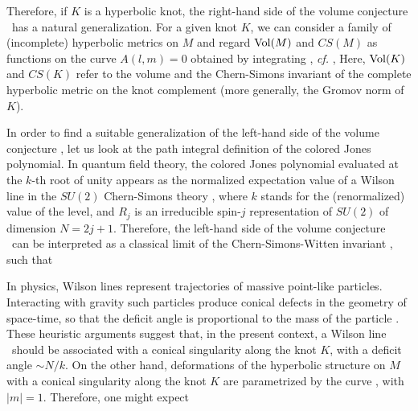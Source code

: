 Therefore, if $K$ is a hyperbolic knot, the right-hand side of
the volume conjecture \csvolumeconj\ has a natural generalization.
For a given knot $K$, we can consider a family
of (incomplete) hyperbolic metrics on $M$
and regard ${\rm Vol}(M)$ and $CS(M)$ as functions
on the curve $A(l,m)=0$ obtained by integrating \csvoldiff,
{\it cf.} \pdqint,
%
\eqn{}
%
Here, ${\rm Vol} (K)$ and $CS(K)$ refer to the volume and
the Chern-Simons invariant of the complete hyperbolic
metric on the knot complement
(more generally, the Gromov norm of $K$).

In order to find a suitable generalization of the left-hand
side of the volume conjecture \csvolumeconj, let us look at
the path integral definition of the colored Jones polynomial.
In quantum field theory, the colored Jones polynomial
evaluated at the $k$-th root of unity
appears as the normalized
expectation value of a Wilson line
in the $SU(2)$ Chern-Simons theory \WittenJones,
%
\eqn{}
%
where $k$ stands for the (renormalized) value of the level,
and $R_j$ is an irreducible spin-$j$ representation of $SU(2)$
of dimension $N=2j+1$.
Therefore, the left-hand side of the volume conjecture \csvolumeconj\
can be interpreted as a classical limit of the Chern-Simons-Witten
invariant \njoneshol, such that
%
\eqn{}
%

In physics,
Wilson lines represent trajectories of massive point-like particles.
Interacting with gravity such particles produce conical defects
in the geometry of space-time, so that the deficit angle
is proportional to the mass of the particle \DJT.
These heuristic arguments suggest that, in the present context,
a Wilson line \njoneshol\ should be associated with a conical
singularity along the knot $K$, with a deficit angle $\sim N/k$.
On the other hand, deformations of the hyperbolic structure on $M$
with a conical singularity along the knot $K$ are parametrized
by the curve \azerolocus, with $|m|=1$. Therefore, one might expect
%
\eqn{}
%


